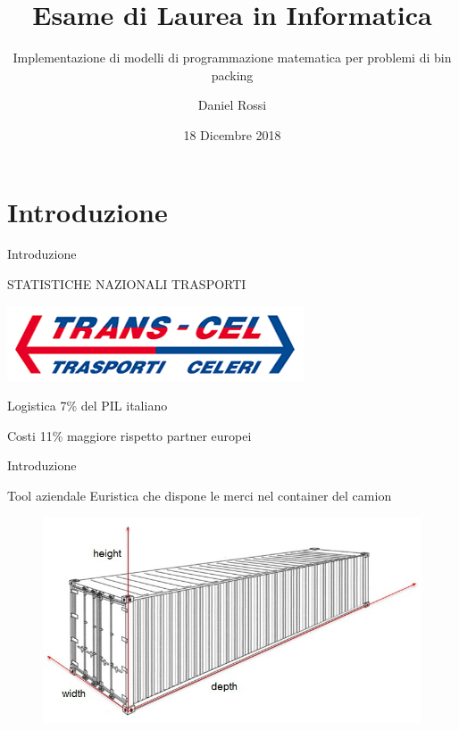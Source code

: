 \documentclass{beamer}
\title{Esame di Laurea in Informatica}
\subtitle{Implementazione di modelli di programmazione matematica per problemi di bin packing}
\author{Daniel Rossi}
\date{18 Dicembre 2018}
\begin{document}
\maketitle


\section{Introduzione}

\begin{frame}{Introduzione}
	\begin{minipage}[c]{0.45\textwidth}
		\large{\uppercase{Statistiche nazionali trasporti}} \vspace{.5em}
	\end{minipage}
	\hfill
	\begin{minipage}[c]{0.45\textwidth}
		\includegraphics[width=\textwidth]{figures/logo}
	\end{minipage}
	\begin{block}{Logistica}
		7\% del PIL italiano
	\end{block}
	\begin{block}{Costi}
		11\% maggiore rispetto partner europei
	\end{block}
\end{frame}

\begin{frame}{Introduzione}
	\begin{block}{Tool aziendale}
		Euristica che dispone le merci nel container del camion
	\end{block}
	\begin{figure}[H]
		\begin{center} \includegraphics[scale=0.5]{figures/photo5805353100838547063}
		\end{center}
	\end{figure}
\end{frame}
\end{document}
